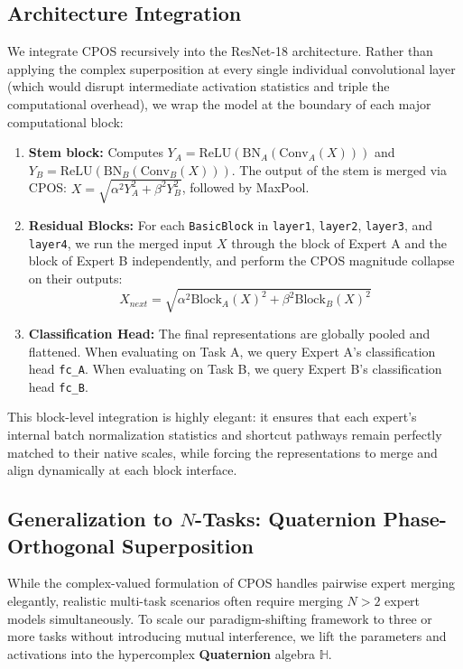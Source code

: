\documentclass{article}
\theoremstyle{plain}
\theoremstyle{definition}
\theoremstyle{remark}
\begin{document}
\subsection{Architecture Integration}
We integrate CPOS recursively into the ResNet-18 architecture. Rather than applying the complex superposition at every single individual convolutional layer (which would disrupt intermediate activation statistics and triple the computational overhead), we wrap the model at the boundary of each major computational block:
\begin{enumerate}
\item \textbf{Stem block:} Computes $Y_A = \text{ReLU}(\text{BN}_{A}(\text{Conv}_{A}(X)))$ and $Y_B = \text{ReLU}(\text{BN}_{B}(\text{Conv}_{B}(X)))$. The output of the stem is merged via CPOS: $X = \sqrt{\alpha^2 Y_A^2 + \beta^2 Y_B^2}$, followed by MaxPool.
\item \textbf{Residual Blocks:} For each \texttt{BasicBlock} in \texttt{layer1}, \texttt{layer2}, \texttt{layer3}, and \texttt{layer4}, we run the merged input $X$ through the block of Expert A and the block of Expert B independently, and perform the CPOS magnitude collapse on their outputs:
\begin{equation}
X_{next} = \sqrt{\alpha^2 \text{Block}_A(X)^2 + \beta^2 \text{Block}_B(X)^2}
\end{equation}
\item \textbf{Classification Head:} The final representations are globally pooled and flattened. When evaluating on Task A, we query Expert A's classification head \texttt{fc\_A}. When evaluating on Task B, we query Expert B's classification head \texttt{fc\_B}.
\end{enumerate}

This block-level integration is highly elegant: it ensures that each expert's internal batch normalization statistics and shortcut pathways remain perfectly matched to their native scales, while forcing the representations to merge and align dynamically at each block interface.

\subsection{Generalization to $N$-Tasks: Quaternion Phase-Orthogonal Superposition}
\label{subsec:qcpos}
While the complex-valued formulation of CPOS handles pairwise expert merging elegantly, realistic multi-task scenarios often require merging $N > 2$ expert models simultaneously. To scale our paradigm-shifting framework to three or more tasks without introducing mutual interference, we lift the parameters and activations into the hypercomplex \textbf{Quaternion} algebra $\mathbb{H}$.
\end{document}
